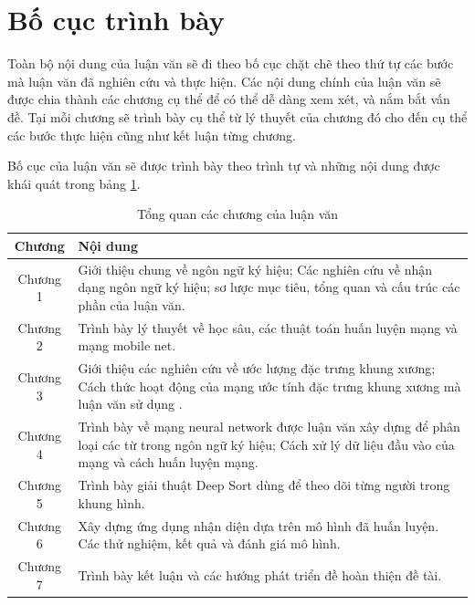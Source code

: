 \section{Bố cục trình bày}
\label{ss:bo_cuc_trinh_bay}

Toàn bộ nội dung của luận văn sẽ đi theo bố cục chặt chẽ theo thứ tự các bước mà luận văn đã nghiên cứu và thực hiện. Các nội dung chính của luận văn sẽ được chia thành các chương cụ thể để có thể dễ dàng xem xét, và nắm bắt vấn đề. Tại mỗi chương sẽ trình bày cụ thể từ lý thuyết của chương đó cho đến cụ thể các bước thực hiện cũng như kết luận từng chương.

Bố cục của luận văn sẽ được trình bày theo trình tự và những nội dung được khái quát trong bảng \ref{table:bo_cuc_luan_van}.

\FloatBarrier
\begin{table}[h]
\caption{Tổng quan các chương của luận văn}
\label{table:bo_cuc_luan_van}
\centering
\begin{center}
\begin{tabular}{|c|p{13cm}|} 
 \hline
Chương  & Nội dung \\
 \hline
 Chương 1 & Giới thiệu chung về ngôn ngữ ký hiệu; Các nghiên cứu về nhận dạng ngôn ngữ ký hiệu; sơ lược mục tiêu, tổng quan và cấu trúc các phần của luận văn.\\
 \hline 
 Chương 2 & Trình bày lý thuyết về học sâu, các thuật toán huấn luyện mạng và mạng mobile net.\\
 \hline 
 Chương 3 & Giới thiệu các nghiên cứu về ước lượng đặc trưng khung xương; Cách thức hoạt động của mạng ước tính đặc trưng khung xương mà luận văn sử dụng .\\
 \hline
 Chương 4 & Trình bày về mạng neural network được luận văn xây dựng để phân loại các từ trong ngôn ngữ ký hiệu; Cách xử lý dữ liệu đầu vào của mạng và cách huấn luyện mạng. \\
 \hline 
 Chương 5 & Trình bày giải thuật Deep Sort dùng để theo dõi từng người trong khung hình.\\
 \hline
 Chương 6 & Xây dựng ứng dụng nhận diện dựa trên mô hình đã huấn luyện. Các thử nghiệm, kết quả và đánh giá mô hình. \\
 \hline
 Chương 7 & Trình bày kết luận và các hướng phát triển đề hoàn thiện đề tài.\\
 \hline
 
\end{tabular}
\end{center}
\end{table}
\FloatBarrier

